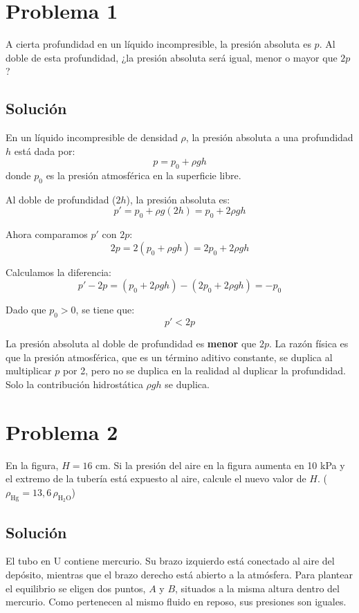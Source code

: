 \documentclass[a4paper]{article}
\begin{document}
\tableofcontents

\section{Problema 1}
A cierta profundidad en un líquido incompresible, la presión absoluta es $p$. Al doble de esta profundidad, ¿la presión absoluta será igual, menor o mayor que $2p$?

\subsection{Solución}

En un líquido incompresible de densidad $\rho$, la presión absoluta a una profundidad $h$ está dada por:
$$
p = p_0 + \rho g h
$$
donde $p_0$ es la presión atmosférica en la superficie libre.

Al doble de profundidad ($2h$), la presión absoluta es:
$$
p' = p_0 + \rho g (2h) = p_0 + 2\rho g h
$$

Ahora comparamos $p'$ con $2p$:
$$
2p = 2\left(p_0 + \rho g h\right) = 2p_0 + 2\rho g h
$$

Calculamos la diferencia:
$$
p' - 2p = \left(p_0 + 2\rho g h\right) - \left(2p_0 + 2\rho g h\right) = -p_0
$$

Dado que $p_0 > 0$, se tiene que:
$$
\boxed{p' < 2p}
$$

La presión absoluta al doble de profundidad es \textbf{menor} que $2p$. La razón física es que la presión atmosférica, que es un término aditivo constante, se duplica al multiplicar $p$ por 2, pero no se duplica en la realidad al duplicar la profundidad. Solo la contribución hidrostática $\rho g h$ se duplica.

\section{Problema 2}
En la figura, $H = 16$ cm. Si la presión del aire en la figura aumenta en 10 kPa y el extremo de la tubería está expuesto al aire, calcule el nuevo valor de $H$. ($\rho_{\text{Hg}} = 13{,}6\,\rho_{\text{H}_2\text{O}}$)



\subsection{Solución}

El tubo en U contiene mercurio. Su brazo izquierdo está conectado al aire del depósito, mientras que el brazo derecho está abierto a la atmósfera. Para plantear el equilibrio se eligen dos puntos, $A$ y $B$, situados a la misma altura dentro del mercurio. Como pertenecen al mismo fluido en reposo, sus presiones son iguales.
\end{document}
